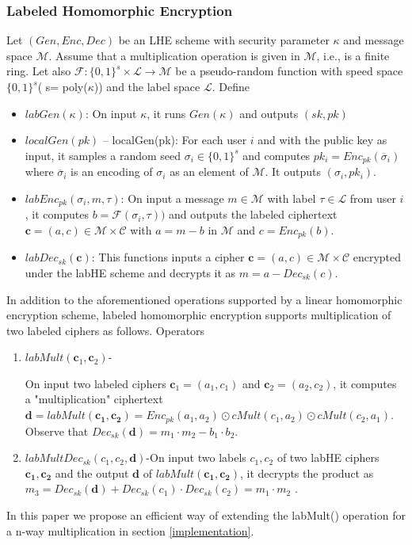 \subsubsection{Labeled Homomorphic Encryption}
Let $(Gen,Enc,Dec)$ be an LHE scheme with security parameter $\kappa$ and message space $\mathcal{M}$. Assume that a multiplication operation is given in $\mathcal{M}$, i.e., is a finite ring. Let also $\mathcal{F}:\{0,1\}^s \times \mathcal{L}\rightarrow \mathcal{M}$ be a pseudo-random function with speed space $\{0,1\}^s$( s= poly($\kappa $)) and the label space $\mathcal{L}$. Define
\begin{itemize}
\item $labGen(\kappa)$: On input $\kappa$, it runs $Gen(\kappa)$ and outputs $(sk,pk)$
\item $localGen(pk)$
– localGen(pk): For each user $i$ and with the public key as input, it samples a random seed $\sigma_i \in \{0,1\}^s$ and computes $pk_i = Enc_{pk}(\ddot{\sigma_i})$ where $\ddot{\sigma_i}$ is an  encoding of $\sigma_i$ as an  element of $\mathcal{M}$. It outputs $(\sigma_i,pk_i)$.
\item $labEnc_{pk}(\sigma_i, m , \tau)$: On input a message $m \in \mathcal{M} $ with label $\tau \in \mathcal{L}$  from user $i$, it computes $b=\mathcal{F}(\sigma_i, \tau))$ and outputs the labeled ciphertext $\mathbf{c}=(a,c) \in \mathcal{M} \times \mathcal{C}$ with $ a= m- b$ in $\mathcal{M}$ and $c=Enc_{pk}(b)$.
\item $labDec_{sk}(\mathbf{c})$: This functions inputs a cipher $\mathbf{c}=(a,c) \in \mathcal{M} \times \mathcal{C}$ encrypted under the labHE scheme and decrypts it as $m=a-Dec_{sk}(c)$.
\end{itemize}
In addition to the aforementioned operations supported by a linear homomorphic encryption scheme, labeled homomorphic encryption supports multiplication of two labeled ciphers as follows.
Operators
\begin{enumerate}\item $labMult(\mathbf{c}_1,\mathbf{c}_2)$-

On input two labeled ciphers $\mathbf{c}_1=(a_1,c_1)$ and $\mathbf{c}_2=(a_2,c_2)$, it computes a "multiplication" ciphertext $\mathbf{d}=labMult(\mathbf{c_1,c_2})=Enc_{pk}(a_1,a_2)\odot cMult(c_1,a_2) \odot cMult(c_2,a_1)$. Observe that $Dec_{sk}(\mathbf{d})=m_1\cdot m_2 -b_1 \cdot b_2$.
\item $labMultDec_{sk}(c_1,c_2,\mathbf{d})$-On input two labels $c_1,c_2$ of two labHE ciphers $\mathbf{c_1},\mathbf{c_2}$ and the output $\mathbf{d}$ of $labMult(\mathbf{c_1},\mathbf{c_2})$, it decrypts the product as $m_3=Dec_{sk}(\mathbf{d})+Dec_{sk}(c_1)\cdot Dec_{sk}(c_2) = m_1\cdot m_2$ .    \end{enumerate}
In this paper we propose an efficient way of extending the labMult() operation for a n-way multiplication in section \ref{implementation}.
